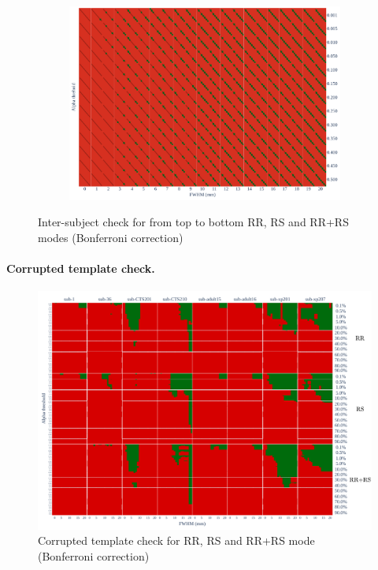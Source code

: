 \documentclass{article}
\begin{document}
\begin{figure}
\begin{subfigure}[t]{0.7\linewidth}
        \includegraphics[width=\linewidth]{figures/inter-subject/one_mct_fwe_bonferroni_RR-RS.pdf}
    \end{subfigure}
    \caption{Inter-subject check for from top to bottom RR, RS and RR+RS modes (Bonferroni correction)}
    \label{fig:ieee-check}
\end{figure}

\paragraph{Corrupted template check.}

\begin{figure}
    \centering
    \includegraphics[width=\linewidth]{figures/template/template_fwe_bonferroni.pdf}
    \caption{Corrupted template check for RR, RS and RR+RS mode (Bonferroni correction)}
    \label{fig:template_bonferroni}
\end{figure}
\end{document}
